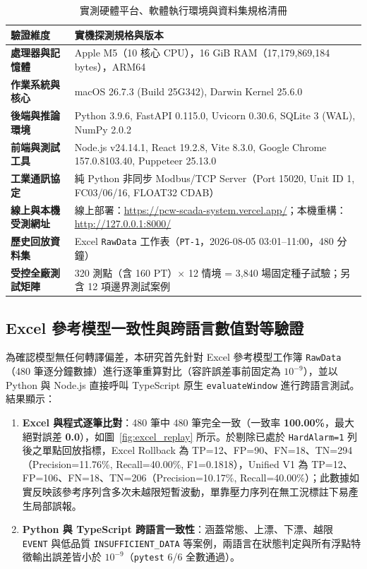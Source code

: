 \documentclass[fontset=none, a4paper, 12pt]{ctexart}
\begin{document}
\begin{doublespace}
\begin{table}[H]
\centering
\caption{實測硬體平台、軟體執行環境與資料集規格清冊}
\label{tab:env_real}
\footnotesize
\renewcommand{\arraystretch}{1.15}
\setlength{\tabcolsep}{5pt}
\begin{tabularx}{0.96\textwidth}{>{\bfseries}lX}
\toprule
驗證維度 & 實機探測規格與版本 \\
\midrule
處理器與記憶體 & Apple M5（10 核心 CPU），16 GiB RAM（17,179,869,184 bytes），ARM64 \\
作業系統與核心 & macOS 26.7.3 (Build 25G342), Darwin Kernel 25.6.0 \\
後端與推論環境 & Python 3.9.6, FastAPI 0.115.0, Uvicorn 0.30.6, SQLite 3 (WAL), NumPy 2.0.2 \\
前端與測試工具 & Node.js v24.14.1, React 19.2.8, Vite 8.3.0, Google Chrome 157.0.8103.40, Puppeteer 25.13.0 \\
工業通訊協定 & 純 Python 非同步 Modbus/TCP Server（Port 15020, Unit ID 1, FC03/06/16, FLOAT32 CDAB） \\
線上與本機受測網址 & 線上部署：\url{https://pcw-scada-system.vercel.app/}；本機重構：\url{http://127.0.0.1:8000/} \\
歷史回放資料集 & Excel \texttt{RawData} 工作表（\texttt{PT-1}，2026-08-05 03:01--11:00，480 分鐘） \\
受控全廠測試矩陣 & 320 測點（含 160 PT）$\times$ 12 情境 = 3,840 場固定種子試驗；另含 12 項邊界測試案例 \\
\bottomrule
\end{tabularx}
\end{table}

\subsection{Excel 參考模型一致性與跨語言數值對等驗證}
為確認模型無任何轉譯偏差，本研究首先針對 Excel 參考模型工作簿 \texttt{RawData}（480 筆逐分鐘數據）進行逐筆重算對比（容許誤差事前固定為 $10^{-9}$），並以 Python 與 Node.js 直接呼叫 TypeScript 原生 \texttt{evaluateWindow} 進行跨語言測試。結果顯示：
\begin{enumerate}
    \item \textbf{Excel 與程式逐筆比對}：480 筆中 480 筆完全一致（一致率 \textbf{100.00\%}，最大絕對誤差 \textbf{0.0}），如圖~\ref{fig:excel_replay} 所示。於剔除已處於 \texttt{HardAlarm=1} 列後之單點回放指標，Excel Rollback 為 TP=12、FP=90、FN=18、TN=294（Precision=11.76\%, Recall=40.00\%, F1=0.1818），Unified V1 為 TP=12、FP=106、FN=18、TN=206（Precision=10.17\%, Recall=40.00\%）；此數據如實反映該參考序列含多次未越限短暫波動，單靠壓力序列在無工況標註下易產生局部誤報。
    \item \textbf{Python 與 TypeScript 跨語言一致性}：涵蓋常態、上漂、下漂、越限 \texttt{EVENT} 與低品質 \texttt{INSUFFICIENT\_DATA} 等案例，兩語言在狀態判定與所有浮點特徵輸出誤差皆小於 $10^{-9}$（\texttt{pytest} 6/6 全數通過）。
\end{enumerate}


\end{doublespace}
\end{document}
